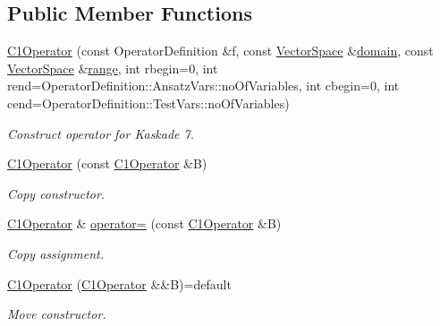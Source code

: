 \subsection*{Public Member Functions}
\begin{DoxyCompactItemize}
\item 
\hyperlink{classSpacy_1_1Kaskade_1_1C1Operator_aa31e9f54fcbb4eb6c40c1cd467d25836_aa31e9f54fcbb4eb6c40c1cd467d25836}{C1\+Operator} (const Operator\+Definition \&f, const \hyperlink{classSpacy_1_1VectorSpace}{Vector\+Space} \&\hyperlink{classSpacy_1_1OperatorBase_a2588f9b3e0188820c4c494e63293dc6f_a2588f9b3e0188820c4c494e63293dc6f}{domain}, const \hyperlink{classSpacy_1_1VectorSpace}{Vector\+Space} \&\hyperlink{classSpacy_1_1OperatorBase_ab19d3b7a6f290b1079248f1e567e53d6_ab19d3b7a6f290b1079248f1e567e53d6}{range}, int rbegin=0, int rend=Operator\+Definition\+::\+Ansatz\+Vars\+::no\+Of\+Variables, int cbegin=0, int cend=Operator\+Definition\+::\+Test\+Vars\+::no\+Of\+Variables)
\begin{DoxyCompactList}\small\item\em Construct operator for Kaskade 7. \end{DoxyCompactList}\item 
\hyperlink{classSpacy_1_1Kaskade_1_1C1Operator_a69a67a899fb71e106b1371117d006659_a69a67a899fb71e106b1371117d006659}{C1\+Operator} (const \hyperlink{classSpacy_1_1Kaskade_1_1C1Operator}{C1\+Operator} \&B)
\begin{DoxyCompactList}\small\item\em Copy constructor. \end{DoxyCompactList}\item 
\hyperlink{classSpacy_1_1Kaskade_1_1C1Operator}{C1\+Operator} \& \hyperlink{classSpacy_1_1Kaskade_1_1C1Operator_ac378b7b319e5160a7ac19a3697b4291a_ac378b7b319e5160a7ac19a3697b4291a}{operator=} (const \hyperlink{classSpacy_1_1Kaskade_1_1C1Operator}{C1\+Operator} \&B)
\begin{DoxyCompactList}\small\item\em Copy assignment. \end{DoxyCompactList}\item 
\hyperlink{classSpacy_1_1Kaskade_1_1C1Operator_aed7bcf133fe772d9ae4b6ad5dcd5674c_aed7bcf133fe772d9ae4b6ad5dcd5674c}{C1\+Operator} (\hyperlink{classSpacy_1_1Kaskade_1_1C1Operator}{C1\+Operator} \&\&B)=default
\begin{DoxyCompactList}\small\item\em Move constructor. \end{DoxyCompactList}\item 

\end{DoxyCompactItemize}
